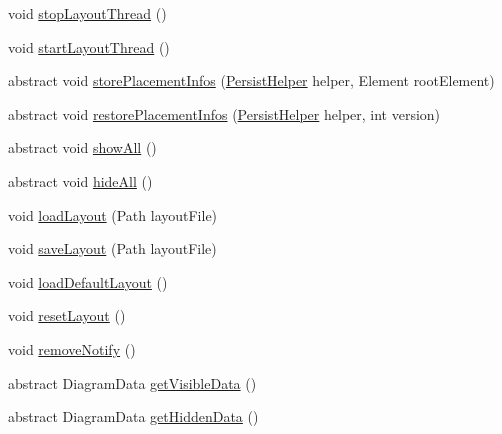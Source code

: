 \begin{DoxyCompactItemize}
\item 
void \hyperlink{classorg_1_1tzi_1_1use_1_1gui_1_1views_1_1diagrams_1_1_diagram_view_a91aaa64c23da56e73fd2bd1e4c8246b0}{stop\-Layout\-Thread} ()
\item 
void \hyperlink{classorg_1_1tzi_1_1use_1_1gui_1_1views_1_1diagrams_1_1_diagram_view_ac054da143c12b3d8e071c5516a74f68e}{start\-Layout\-Thread} ()
\item 
abstract void \hyperlink{classorg_1_1tzi_1_1use_1_1gui_1_1views_1_1diagrams_1_1_diagram_view_a52ef56f68b0c502cebcce5eee461da26}{store\-Placement\-Infos} (\hyperlink{classorg_1_1tzi_1_1use_1_1gui_1_1util_1_1_persist_helper}{Persist\-Helper} helper, Element root\-Element)
\item 
abstract void \hyperlink{classorg_1_1tzi_1_1use_1_1gui_1_1views_1_1diagrams_1_1_diagram_view_a1212b0c863adebec8ad6c02becd75ec1}{restore\-Placement\-Infos} (\hyperlink{classorg_1_1tzi_1_1use_1_1gui_1_1util_1_1_persist_helper}{Persist\-Helper} helper, int version)
\item 
abstract void \hyperlink{classorg_1_1tzi_1_1use_1_1gui_1_1views_1_1diagrams_1_1_diagram_view_a717a4fb231b4da1d5d5f29dc0e657c99}{show\-All} ()
\item 
abstract void \hyperlink{classorg_1_1tzi_1_1use_1_1gui_1_1views_1_1diagrams_1_1_diagram_view_a2c1a85c4fbabfe3bac8f19a6c2f0af61}{hide\-All} ()
\item 
void \hyperlink{classorg_1_1tzi_1_1use_1_1gui_1_1views_1_1diagrams_1_1_diagram_view_a1743ffa8587658cc84be12ef901a1352}{load\-Layout} (Path layout\-File)
\item 
void \hyperlink{classorg_1_1tzi_1_1use_1_1gui_1_1views_1_1diagrams_1_1_diagram_view_a7eb311c446621309f91e37f2e29822e8}{save\-Layout} (Path layout\-File)
\item 
void \hyperlink{classorg_1_1tzi_1_1use_1_1gui_1_1views_1_1diagrams_1_1_diagram_view_ac8d278015c7d653a2fea7ff8d5e27cbd}{load\-Default\-Layout} ()
\item 
void \hyperlink{classorg_1_1tzi_1_1use_1_1gui_1_1views_1_1diagrams_1_1_diagram_view_a563130ee6bfc12401bafdfec84fb0016}{reset\-Layout} ()
\item 
void \hyperlink{classorg_1_1tzi_1_1use_1_1gui_1_1views_1_1diagrams_1_1_diagram_view_af3e50f89de715ae8b8f0becf80526d6b}{remove\-Notify} ()
\item 
abstract Diagram\-Data \hyperlink{classorg_1_1tzi_1_1use_1_1gui_1_1views_1_1diagrams_1_1_diagram_view_a279af13df54f7030859a1e48e0f1066b}{get\-Visible\-Data} ()
\item 
abstract Diagram\-Data \hyperlink{classorg_1_1tzi_1_1use_1_1gui_1_1views_1_1diagrams_1_1_diagram_view_a9f9249b9321ecaba808b5d9baf4f8b0f}{get\-Hidden\-Data} ()
\end{DoxyCompactItemize}
